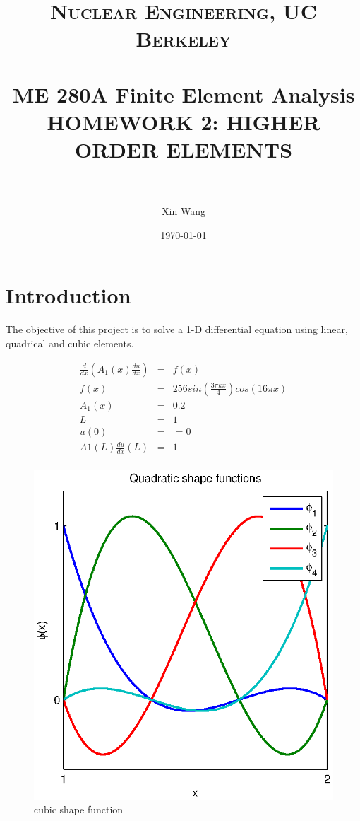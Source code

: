 \documentclass[paper=a4, fontsize=11pt]{article} %
\title{	
\normalfont \normalsize 
\textsc{Nuclear Engineering, UC Berkeley} \\ [25pt] %
\horrule{0.5pt} \\[0.4cm] %
\huge ME 280A Finite Element Analysis \\HOMEWORK 2: HIGHER ORDER ELEMENTS  \\  %
\horrule{2pt} \\[0.5cm] %
}
\author{Xin Wang} %
\date{\normalsize\today} %
\begin{document}
\maketitle %

\newpage
\section{Introduction}
The objective of this project is to solve a 1-D differential equation using linear, quadrical and cubic elements. 

\begin{eqnarray}
\frac{d}{dx}(A_1(x) \frac{du}{dx}) &=& f(x)\nonumber\\
f(x)&=&256sin(\frac{3\pi kx}{4})cos(16 \pi x) \nonumber\\
A_1(x)& = &0.2 \nonumber\\
L&=&1 \nonumber\\
u(0)& =& =0 \nonumber\\
A1(L)\frac{du}{dx}(L) &=& 1 \nonumber\\
\end{eqnarray}

\begin{figure}
\centering
\includegraphics[scale=.7]{cubic_shape_function.eps}
\caption{cubic shape function}
\label{fig:cubic}
\end{figure}
\end{document}
